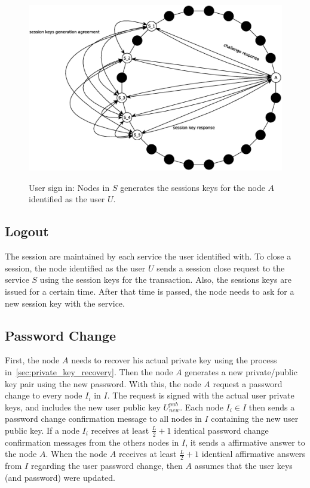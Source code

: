 \begin{figure}[!htb]
\centering
\includegraphics[width=14cm]{../img/sign_in_3}\\
\caption{User sign in: Nodes in $S$ generates the sessions keys for the node
$A$ identified as the user $U$.}
\label{fig:sign_in_3}
\end{figure}

\subsection{Logout}
The session are maintained by each service the user identified with. To close a
session, the node identified as the user $U$ sends a session close request to
the service $S$ using the session keys for the transaction. Also, the sessions
keys are issued for a certain time. After that time is passed, the node needs
to ask for a new session key with the service.


\subsection{Password Change}

First, the node $A$ needs to recover his actual private key using the process
in~\ref{sec:private_key_recovery}. Then the node $A$ generates a new private/public
key pair using the new password.  With this, the node $A$ request a
password change to every node $I_i$ in $I$. The request is signed with the
actual user private keys, and includes the new user public key $U^{pub}_{new}$.
Each node $I_i \in I$ then sends a password change confirmation message to all nodes
in $I$ containing the new user public key. If a node $I_i$ receives at
least $\frac{L}{2} + 1$ identical password change confirmation messages from
the others nodes in $I$, it sends a affirmative answer to the node $A$.
 When the node $A$ receives at least $\frac{L}{2} + 1$ identical affirmative
answers from $I$ regarding the user password change, then $A$ assumes that the
user keys (and password) were updated.


